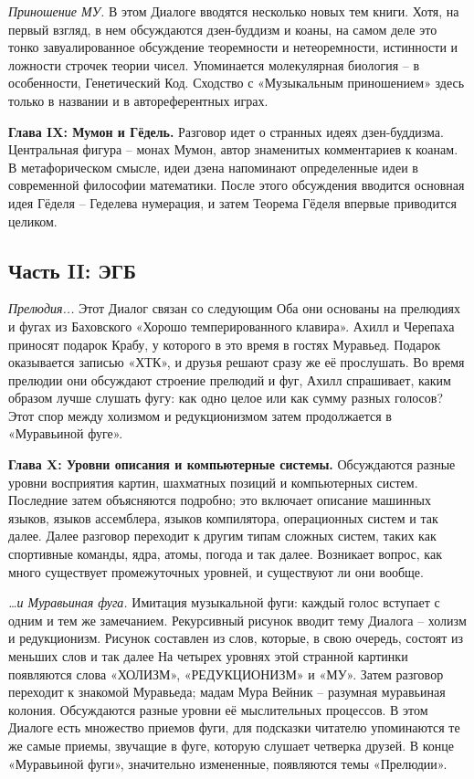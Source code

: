 \documentclass[../main.tex]{subfiles}
\begin{document}
\emph{Приношение МУ.}
В этом Диалоге вводятся несколько новых тем книги. Хотя, на первый взгляд, в нем обсуждаются дзен-буддизм и коаны, на самом деле это тонко завуалированное обсуждение теоремности и нетеоремности, истинности и ложности строчек теории чисел. Упоминается молекулярная биология \--- в особенности, Генетический Код. Сходство с «Музыкальным приношением» здесь только в названии и в автореферентных играх.

\textbf{Глава IX: Мумон и Гёдель.}
Разговор идет о странных идеях дзен-буддизма. Центральная фигура \--- монах Мумон, автор знаменитых комментариев к коанам. В метафорическом смысле, идеи дзена напоминают определенные идеи в современной философии математики. После этого обсуждения вводится основная идея Гёделя \--- Геделева нумерация, и затем Теорема Гёделя впервые приводится целиком.


\subsection*{Часть II: ЭГБ}

\emph{Прелюдия...}
Этот Диалог связан со следующим Оба они основаны на прелюдиях и фугах из Баховского «Хорошо темперированного клавира». Ахилл и Черепаха приносят подарок Крабу, у которого в это время в гостях Муравьед. Подарок оказывается записью «ХТК», и друзья решают сразу же её прослушать. Во время прелюдии они обсуждают строение прелюдий и фуг, Ахилл спрашивает, каким образом лучше слушать фугу: как одно целое или как сумму разных голосов? Этот спор между холизмом и редукционизмом затем продолжается в «Муравьиной фуге».

\textbf{Глава X: Уровни описания и компьютерные системы.}
Обсуждаются разные уровни восприятия картин, шахматных позиций и компьютерных систем. Последние затем объясняются подробно; это включает описание машинных языков, языков ассемблера, языков компилятора, операционных систем и так далее. Далее разговор переходит к другим типам сложных систем, таких как спортивные команды, ядра, атомы, погода и так далее. Возникает вопрос, как много существует промежуточных уровней, и существуют ли они вообще.

\emph{\ldots и Муравьиная фуга.}
Имитация музыкальной фуги: каждый голос вступает с одним и тем же замечанием. Рекурсивный рисунок вводит тему Диалога \--- холизм и редукционизм. Рисунок составлен из слов, которые, в свою очередь, состоят из меньших слов и так далее На четырех уровнях этой странной картинки появляются слова «ХОЛИЗМ», «РЕДУКЦИОНИЗМ» и «МУ». Затем разговор переходит к знакомой Муравьеда; мадам Мура Вейник \--- разумная муравьиная колония. Обсуждаются разные уровни её мыслительных процессов. В этом Диалоге есть множество приемов фуги, для подсказки читателю упоминаются те же самые приемы, звучащие в фуге, которую слушает четверка друзей. В конце «Муравьиной фуги», значительно измененные, появляются темы «Прелюдии».
\end{document}
